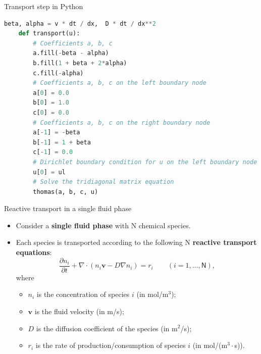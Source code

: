 %
%
\begin{frame}[fragile]{Transport step in Python}

\begin{lstlisting}[language=Python, caption=Transport step in Pythons]
	beta, alpha = v * dt / dx,  D * dt / dx**2
	def transport(u):
		# Coefficients a, b, c
		a.fill(-beta - alpha)
		b.fill(1 + beta + 2*alpha)
		c.fill(-alpha)
		# Coefficients a, b, c on the left boundary node
		a[0] = 0.0
		b[0] = 1.0
		c[0] = 0.0
		# Coefficients a, b, c on the right boundary node
		a[-1] = -beta
		b[-1] = 1 + beta
		c[-1] = 0.0
		# Dirichlet boundary condition for u on the left boundary node
		u[0] = ul
		# Solve the tridiagonal matrix equation
		thomas(a, b, c, u)
\end{lstlisting}

\end{frame}
%
%
\begin{frame}{Reactive transport in a single fluid phase}
\begin{itemize}
\item Consider a \alert{\bf single fluid phase} with N chemical species.
\item Each species is transported according to the following N \alert{\bf reactive transport equations}:
\[
\frac{\partial n_{i}}{\partial t}+\nabla\cdot(n_{i}\boldsymbol{v}-D\nabla n_{i})=r_{i}\qquad(i=1,\ldots,\mathsf{N}),
\]
where
\begin{itemize}
\item $n_{i}$ is the \alert{concentration} of species $i$ (in mol/m$^{3}$);
\item $\boldsymbol{v}$ is the \alert{fluid velocity}
(in m/s);
\item $D$ is the \alert{diffusion coefficient} of the species (in m$^{2}$/s);
\item $r_{i}$ is the \alert{rate of production\slash consumption} of species
$i$ (in mol/(m$^{3}\cdot$s)). 
\end{itemize}
\end{itemize}
\end{frame}
